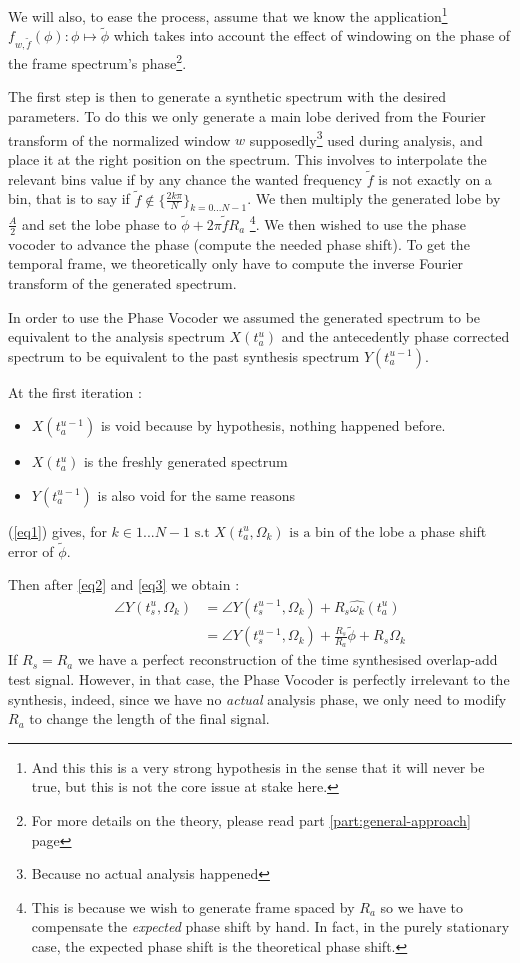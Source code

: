 \documentclass[]{article}
\begin{document}
We will also, to ease the process, assume that we know the application\footnote{And this this is a very strong hypothesis in the sense that it will never be true, but this is not the core issue at stake here.} ${f_{w, \tilde{f}}(\phi) : \phi \mapsto \tilde{\phi}}$ which takes into account the effect of windowing on the phase of the frame spectrum's phase\footnote{For more details on the theory, please read part \ref{part:general-approach} page \pageref{part:general-approach}}.

The first step is then to generate a synthetic spectrum with the desired parameters. To do this we only generate a main lobe derived from the Fourier transform of the normalized window $w$ supposedly\footnote{Because no actual analysis happened} used during analysis, and place it at the right position on the spectrum. This involves to interpolate the relevant bins value if by any chance the wanted frequency $\tilde{f}$ is not exactly on a bin, that is to say if $\tilde{f} \notin \{\frac{2 k \pi}{N} \}_{k=0...N-1}$. We then multiply the generated lobe by $\frac{A}{2}$ and set the lobe phase to $\tilde{\phi} + 2\pi \tilde{f} R_a$    \footnote{This is because we wish to generate frame spaced by $R_a$ so we have to compensate the \emph{expected} phase shift by hand. In fact, in the purely stationary case, the expected phase shift is the theoretical phase shift.}. We then wished to use the phase vocoder to advance the phase (compute the needed phase shift). To get the temporal frame, we theoretically only have to compute the inverse Fourier transform of the generated spectrum.

In order to use the Phase Vocoder we assumed the generated spectrum to be equivalent to the analysis spectrum $X(t_a^u)$ and the antecedently phase corrected spectrum to be equivalent to the past synthesis spectrum $Y(t_a^{u-1})$.

At the first iteration :
\begin{itemize}
	\item $X(t_a^{u-1})$ is void because by hypothesis, nothing happened before.
	\item $X(t_a^u)$ is the freshly generated spectrum
	\item $Y(t_a^{u-1})$ is also void for the same reasons
\end{itemize}
(\ref{eq1}) gives, for $k \in {1...N-1} \text{ s.t } X(t_a^{u}, \Omega_k) \text{ is a bin of the lobe}$ a phase shift error of $\tilde{\phi}$.

Then after \ref{eq2} and \ref{eq3} we obtain :
\begin{equation*}
\begin{split}
\angle Y(t_s^u, \Omega_k) & = \angle Y(t_s^{u-1}, \Omega_k) + R_s \hat{\omega_k}(t_a^u)\\
& = \angle Y(t_s^{u-1}, \Omega_k) + \frac{R_s}{R_a}\tilde{\phi} + R_s\Omega_k
\end{split}
\end{equation*}
If $R_s = R_a$ we have a perfect reconstruction of the time synthesised overlap-add test signal. However, in that case, the Phase Vocoder is perfectly irrelevant to the synthesis, indeed, since we have no \emph{actual} analysis phase, we only need to modify $R_a$ to change the length of the final signal.
\end{document}
